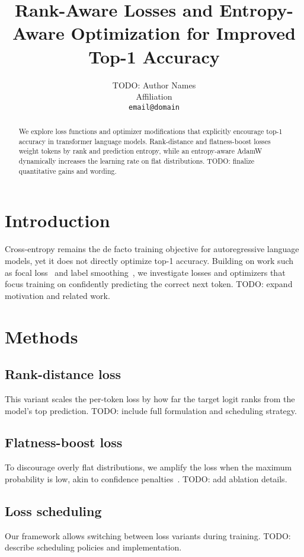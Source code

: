 \documentclass{article}
\title{Rank-Aware Losses and Entropy-Aware Optimization for Improved Top-1 Accuracy}
\author{TODO: Author Names\\Affiliation\\\texttt{email@domain}}
\begin{document}
\maketitle

\begin{abstract}
We explore loss functions and optimizer modifications that explicitly encourage top-1 accuracy in transformer language models. Rank-distance and flatness-boost losses weight tokens by rank and prediction entropy, while an entropy-aware AdamW dynamically increases the learning rate on flat distributions. TODO: finalize quantitative gains and wording.
\end{abstract}

\section{Introduction}
Cross-entropy remains the de facto training objective for autoregressive language models, yet it does not directly optimize top-1 accuracy. Building on work such as focal loss~\cite{lin2017focal} and label smoothing~\cite{szegedy2016rethinking}, we investigate losses and optimizers that focus training on confidently predicting the correct next token. TODO: expand motivation and related work.

\section{Methods}
\subsection{Rank-distance loss}
This variant scales the per-token loss by how far the target logit ranks from the model's top prediction. TODO: include full formulation and scheduling strategy.

\subsection{Flatness-boost loss}
To discourage overly flat distributions, we amplify the loss when the maximum probability is low, akin to confidence penalties~\cite{pereyra2017regularizing}. TODO: add ablation details.

\subsection{Loss scheduling}
Our framework allows switching between loss variants during training. TODO: describe scheduling policies and implementation.
\end{document}
